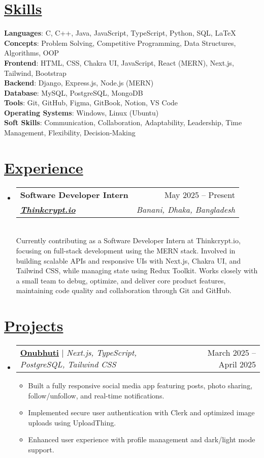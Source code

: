 \documentclass[a4paper, 11pt]{article}
\newcommand{\resumeItem}[1]{
  \item\small{
    {#1 \vspace{-2pt}}
  }
}
\newcommand{\resumeSection}[2]{
  \section{\textbf{\href{#1}{#2}}}
}
\newcommand{\resumeSubheading}[5]{
  \vspace{-2pt}\item
    \begin{tabularx}{\textwidth}[t]{X r}
      \textbf{#1} & #2 \\
      \textbf{\textit{\href{#3}{\small #4}}} & \textit{\small #5} \\
    \end{tabularx}\vspace{-7pt}
}
\newcommand{\resumeProjectHeading}[2]{
    \item
    \begin{tabularx}{\textwidth}{X r}
      #1 & #2 \\
    \end{tabularx}\vspace{-7pt}
}
\newcommand{\resumeSubHeadingListStart}{\begin{itemize}[leftmargin=0in, label={}]}
\newcommand{\resumeSubHeadingListEnd}{\end{itemize}}
\newcommand{\resumeItemListStart}{\begin{itemize}}
\newcommand{\resumeItemListEnd}{\end{itemize}\vspace{-5pt}}
\begin{document}
\resumeSection{https://joyant.me/skills}{Skills}
 \begin{itemize}[leftmargin=0in, label={}]
    \small{\item{
        \textbf{Languages}{: C, C++, Java, JavaScript, TypeScript, Python, SQL, LaTeX} \\
        \textbf{Concepts}{: Problem Solving, Competitive Programming, Data Structures, Algorithms, OOP} \\
        \textbf{Frontend}{: HTML, CSS, Chakra UI, JavaScript, React (MERN), Next.js, Tailwind, Bootstrap} \\
        \textbf{Backend}{: Django, Express.js, Node.js (MERN)} \\
        \textbf{Database}{: MySQL, PostgreSQL, MongoDB} \\
        \textbf{Tools}{: Git, GitHub, Figma, GitBook, Notion, VS Code} \\
        \textbf{Operating Systems}{: Windows, Linux (Ubuntu)} \\
        \textbf{Soft Skills}{: Communication, Collaboration, Adaptability, Leadership, Time Management, Flexibility, Decision-Making}
    }}
 \end{itemize}

\resumeSection{https://joyant.me/experience}{Experience}
    \resumeSubHeadingListStart
        \resumeSubheading
            {Software Developer Intern}{May 2025 -- Present}
            {https://www.thinkcrypt.dev/}{Thinkcrypt.io}{Banani, Dhaka, Bangladesh } \\ \vspace{10pt}
            Currently contributing as a Software Developer Intern at Thinkcrypt.io, focusing on full-stack development using the MERN stack. Involved in building scalable APIs and responsive UIs with Next.js, Chakra UI, and Tailwind CSS, while managing state using Redux Toolkit. Works closely with a small team to debug, optimize, and deliver core product features, maintaining code quality and collaboration through Git and GitHub.
    \resumeItemListEnd

\resumeSection{https://joyant.me/projects}{Projects}
  \resumeSubHeadingListStart
    \resumeProjectHeading
        {\textbf{\href{https://onubhuti.vercel.app/}{Onubhuti}} $|$ \emph{Next.js, TypeScript, PostgreSQL, Tailwind CSS}}{March 2025 -- April 2025}
    \resumeItemListStart
      \resumeItem{Built a fully responsive social media app featuring posts, photo sharing, follow/unfollow, and real-time notifications.}
      \resumeItem{Implemented secure user authentication with Clerk and optimized image uploads using UploadThing.}
      \resumeItem{Enhanced user experience with profile management and dark/light mode support.}
    \resumeItemListEnd
  \resumeSubHeadingListEnd
\end{document}
